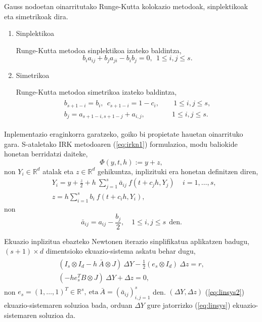 Gauss nodoetan oinarritutako Runge-Kutta kolokazio metodoak, sinplektikoak eta simetrikoak \cite{Sanz-Serna1992} dira. 
\begin{enumerate}
\item Sinplektikoa

Runge-Kutta metodoa sinplektikoa izateko baldintza,
\begin{equation} 
\label{eq:sympl}
b_{i}a_{ij}+b_{j}a_{ji}-b_{i}b_{j}=0, \ \ 1 \leqslant i,j \leqslant s.
\end{equation} 
\item Simetrikoa

Runge-Kutta metodoa simetrikoa izateko baldintza,
\begin{align}
\label{eq:simm}
\begin{split}
b_{s+1-i}=b_i, \ \ {c}_{s+1-i}=1-{c}_i,& \quad \ 1\leqslant i,j \leqslant s, \\
b_j={a}_{s+1-i,s+1-j}+a_{i,j},& \quad 1\leqslant i,j \leqslant s. 
\end{split}
\end{align} 
\end{enumerate}

Inplementazio eraginkorra garatzeko, goiko bi propietate hauetan oinarrituko gara.
S-ataletako IRK metodoaren (\ref{eq:irkn1}) formulazioa, modu baliokide honetan berridatzi daiteke,
\begin{equation}
\Phi(y,t,h):=y+z,
\end{equation}
non $Y_i \in \mathbb{R}^d$ atalak eta $z \in \mathbb{R}^d$ gehikuntza, inplizituki era honetan definitzen diren,
\begin{align}
&Y_{i}=y+\frac{z}{2}+ h\ \sum^s_{j=1}{\bar{a}_{ij}\ f(t+c_jh,Y_{j})}\ \ \ \ \ i=1 ,\dots, s,\\
&z=h \sum_{i=1}^{s} {b_i \ f(t+c_ih,Y_{i})},
\end{align} 
non
\begin{equation}
\bar{a}_{ij}=a_{ij}-\frac{b_j}{2}, \quad 1\leqslant i,j \leqslant s \ \ \text{den}.
\end{equation} 

Ekuazio inplizitua ebazteko Newtonen iterazio sinplifikatua aplikatzen badugu, $(s+1) \times d$ dimentsioko ekuazio-sistema askatu behar dugu,
\begin{align}
\label{eq:linsys2}
\begin{split}
(I_s \otimes I_d- h \ \bar{A} \otimes J) \ \Delta Y - \frac{1}{2}(e_s \otimes I_d) \ \Delta z =r,\\
(-h e_s^T B \otimes J) \ \Delta Y+  \Delta z=0,
\end{split}
\end{align}
non $e_s=(1,\dots,1)^T \in \mathbb{R}^{s}, \ \text{eta} \ \bar{A}=(\bar{a}_{ij})_{i,j=1}^s$ den. $(\Delta Y, \Delta z)$ (\ref{eq:linsys2}) ekuazio-sistemaren soluzioa bada, orduan $\Delta Y$ gure jatorrizko (\ref{eq:linsys}) ekuazio-sistemaren soluzioa da.

